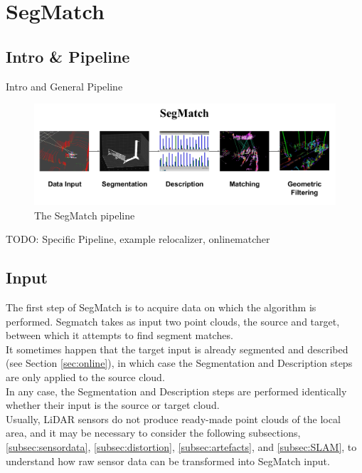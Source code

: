 \chapter{SegMatch}
\label{chap:segmatch}

\section{Intro \& Pipeline}
\label{sec:intro-pipeline}
Intro and General Pipeline\\

\begin{figure}
  \centering
  \includegraphics[width=5.2in]{images/pipeline.pdf}
  \caption{The SegMatch pipeline}
  \label{fig:pipeline}
\end{figure}

TODO: Specific Pipeline, example relocalizer, onlinematcher\\

\section{Input}
\label{sec:input}

The first step of SegMatch is to acquire data on which the algorithm is performed. Segmatch takes as input two point clouds, the source and target, between which it attempts to find segment matches.\\

It sometimes happen that the target input is already segmented and described (see Section \ref{sec:online}), in which case the Segmentation and Description steps are only applied to the source cloud.\\

In any case, the Segmentation and Description steps are performed identically whether their input is the source or target cloud.\\

Usually, LiDAR sensors do not produce ready-made point clouds of the local area, and it may be necessary to consider the following subsections, \ref{subsec:sensordata}, \ref{subsec:distortion}, \ref{subsec:artefacts}, and \ref{subsec:SLAM}, to understand how raw sensor data can be transformed into SegMatch input.

